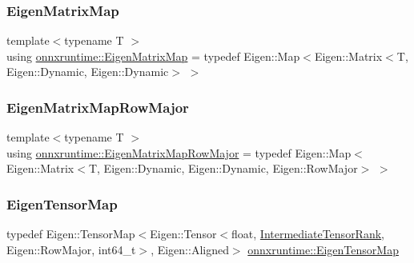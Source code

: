 \subsubsection{\texorpdfstring{Eigen\+Matrix\+Map}{EigenMatrixMap}}
{\footnotesize\ttfamily template$<$typename T $>$ \\
using \mbox{\hyperlink{namespaceonnxruntime_a0d10378b0bb27204277ff1ec0661cc11}{onnxruntime\+::\+Eigen\+Matrix\+Map}} = typedef Eigen\+::\+Map$<$Eigen\+::\+Matrix$<$T, Eigen\+::\+Dynamic, Eigen\+::\+Dynamic$>$ $>$}

\mbox{\label{namespaceonnxruntime_a658732aef7feb5d0ba351a926a9c8b31}} 
\subsubsection{\texorpdfstring{Eigen\+Matrix\+Map\+Row\+Major}{EigenMatrixMapRowMajor}}
{\footnotesize\ttfamily template$<$typename T $>$ \\
using \mbox{\hyperlink{namespaceonnxruntime_a658732aef7feb5d0ba351a926a9c8b31}{onnxruntime\+::\+Eigen\+Matrix\+Map\+Row\+Major}} = typedef Eigen\+::\+Map$<$ Eigen\+::\+Matrix$<$T, Eigen\+::\+Dynamic, Eigen\+::\+Dynamic, Eigen\+::\+Row\+Major$>$ $>$}

\mbox{\label{namespaceonnxruntime_ab7d616c868a1ec06b740dc57a0e467b9}} 
\subsubsection{\texorpdfstring{Eigen\+Tensor\+Map}{EigenTensorMap}}
{\footnotesize\ttfamily typedef Eigen\+::\+Tensor\+Map$<$Eigen\+::\+Tensor$<$float, \mbox{\hyperlink{namespaceonnxruntime_a4d3d095c777de3e01ad735f72a5072d5}{Intermediate\+Tensor\+Rank}}, Eigen\+::\+Row\+Major, int64\+\_\+t$>$, Eigen\+::\+Aligned$>$ \mbox{\hyperlink{namespaceonnxruntime_ab7d616c868a1ec06b740dc57a0e467b9}{onnxruntime\+::\+Eigen\+Tensor\+Map}}}

\mbox{\label{namespaceonnxruntime_a0f5d0e96b27a203da5065e22dfa6f28e}} 
